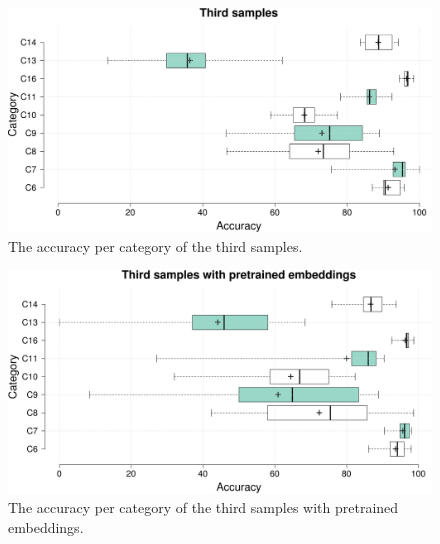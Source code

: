  \begin{figure}[h]
    \centering
    \includegraphics[width =\textwidth]{Images/CM3Boxplot.png}
    \caption{The accuracy per category of the third samples.}
    \label{CM3Boxplot}
\end{figure}

 \begin{figure}[h]
    \centering
    \includegraphics[width =\textwidth]{Images/CM3EmbeddingsBoxplot.png}
    \caption{The accuracy per category of the third samples with pretrained embeddings.}
    \label{CM3EmbeddingsBoxplot}
\end{figure}

